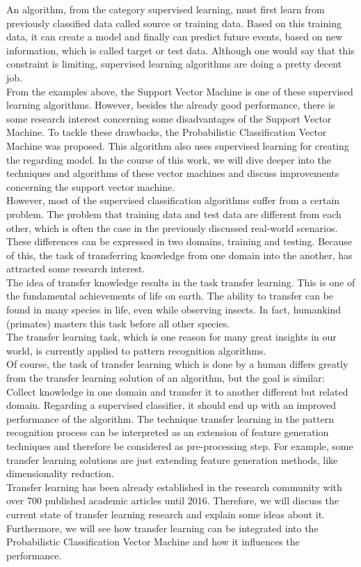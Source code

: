 An algorithm, from the category supervised learning, must first learn from previously classified data called source or training data. Based on this training data, it can create a model and finally can predict future events, based on new information, which is called target or test data.
Although one would say that this constraint is limiting, supervised learning algorithms are doing a pretty decent job.\cite[p. 1]{Weiss.2016}\cite[p. 7]{Theodoridis.2008}\\
From the examples above, the Support Vector Machine is one of these supervised learning algorithms.
However, besides the already good performance, there is some research interest concerning some disadvantages of the Support Vector Machine.
To tackle these drawbacks, the Probabilistic Classification Vector Machine was proposed.
This algorithm also uses supervised learning for creating the regarding model.\cite{Chen.2009}
In the course of this work, we will dive deeper into the techniques and algorithms of these vector machines and discuss improvements concerning the support vector machine.\\
However, most of the supervised classification algorithms suffer from a certain problem. 
The problem that training data and test data are different from each other, which is often the case in the previously discussed real-world scenarios.
These differences can be expressed in two domains, training and testing.
Because of this, the task of transferring knowledge from one domain into the another, has attracted some research interest.\cite{Pan.2010}\\
The idea of transfer knowledge results in the task transfer learning. 
This is one of the fundamental achievements of life on earth.
The ability to transfer can be found in many species in life, even while observing insects.
In fact, humankind (primates) masters this task before all other species.\cite[p. 198-200]{Buchholtz.1982}\\
The transfer learning task, which is one reason for many great insights in our world, is currently applied to pattern recognition algorithms.\\
Of course, the task of transfer learning which is done by a human differs greatly from the transfer learning solution of an algorithm, but the goal is similar:
Collect knowledge in one domain and transfer it to another different but related domain. Regarding a supervised classifier, it should end up with an improved performance of the algorithm.\cite{Pan.2010}
The technique transfer learning in the pattern recognition process can be interpreted as an extension of feature generation techniques and therefore be considered as pre-processing step.
For example, some transfer learning solutions are just extending feature generation methods, like dimensionality reduction.\\
Transfer learning has been already established in the research community with over 700 published academic articles until 2016.\cite[p. 2]{Weiss.2016}
Therefore, we will discuss the current state of transfer learning research and explain some ideas about it.
Furthermore, we will see how transfer learning can be integrated into the Probabilistic Classification Vector Machine and how it influences the performance.
